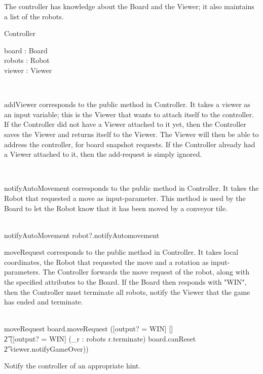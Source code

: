 \documentclass[12pt]{article}
\begin{document}
The controller has knowledge about the Board and the Viewer; it also maintains a list of the robots.
\begin{class}{Controller}
\begin{state}
board : Board \\
robots : \power Robot \\
viewer : Viewer
\end{state}\\
\begin{zpar}
addViewer corresponds to the public method in Controller. It takes a viewer as an input variable; this is the Viewer that wants to attach itself to the controller. If the Controller did not have a Viewer attached to it yet, then the Controller saves the Viewer and returns itself to the Viewer. The Viewer will then be able to address the controller, for board snapshot requests. If the Controller already had a Viewer attached to it, then the add-request is simply ignored.
\end{zpar} \\
\begin{zpar}
notifyAutoMovement corresponds to the public method in Controller. It takes the Robot that requested a move as input-parameter. This method is used by the Board to let the Robot know that it has been moved by a conveyor tile.
\end{zpar} \\
notifyAutoMovement \sdef robot?.notifyAutomovement \\
\znewpage
\begin{zpar}
moveRequest corresponds to the public method in Controller. It takes local coordinates, the Robot that requested the move and a rotation as input-parameters. The Controller forwards the move request of the robot, along with the specified attributes to the Board. If the Board then responds with "WIN", then the Controller must terminate all robots, notify the Viewer that the game has ended and terminate.
\end{zpar} \\
moveRequest \sdef board.moveRequest \comp ([output? \not = WIN] [] \\ \t2 ([output? = WIN] \wedge (\bigwedge_{r : robots} r.terminate) \wedge board.canReset \; \; \wedge \\ \t2 viewer.notifyGameOver)) \\
\begin{zpar}
Notify the controller of an appropriate hint.
\end{zpar} \\

\end{class}
\end{document}
